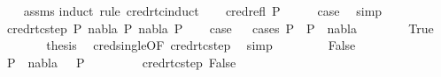 \begin{isabellebody}
%
\isadelimproof
\ \ %
\endisadelimproof
%
\isatagproof
{}\isamarkupfalse%
\ assms\isanewline
{}\isamarkupfalse%
{\isacharparenleft}{\kern0pt}induct\ rule{\isacharcolon}{\kern0pt}\ cred{\isacharunderscore}{\kern0pt}rtc{\isachardot}{\kern0pt}induct{\isacharparenright}{\kern0pt}\isanewline
\ \ \isamarkupfalse%
\ {\isacharparenleft}{\kern0pt}cred{\isacharunderscore}{\kern0pt}refl\ P{}{\isacharparenright}{\kern0pt}\isanewline
\ \ \isamarkupfalse%
\ \isamarkupfalse%
\ {\isacharquery}{\kern0pt}case\ \isamarkupfalse%
\ simp\isanewline
{}\isamarkupfalse%
\isanewline
\ \ \isamarkupfalse%
\ {\isacharparenleft}{\kern0pt}cred{\isacharunderscore}{\kern0pt}rtc{\isacharunderscore}{\kern0pt}step\ P{}\ nabla{}\ P{}\ nabla{}\ P{}{\isacharparenright}{\kern0pt}\isanewline
\ \ \isamarkupfalse%
\ {\isacharquery}{\kern0pt}case\isanewline
\ \ \isamarkupfalse%
{\isacharparenleft}{\kern0pt}cases\ {\isachardoublequoteopen}P{}\ {\isacharequal}{\kern0pt}\ P{}\ {\isasymand}\ nabla{}\ {\isacharequal}{\kern0pt}\ {\isacharbraceleft}{\kern0pt}{\isacharbraceright}{\kern0pt}{\isachardoublequoteclose}{\isacharparenright}{\kern0pt}\isanewline
\ \ \ \ \isamarkupfalse%
\ True\isanewline
\ \ \ \ \isamarkupfalse%
\ \isamarkupfalse%
\ {\isacharquery}{\kern0pt}thesis\ \isamarkupfalse%
\ cred{\isacharunderscore}{\kern0pt}single{\isacharbrackleft}{\kern0pt}OF\ cred{\isacharunderscore}{\kern0pt}rtc{\isacharunderscore}{\kern0pt}step{\isacharparenleft}{\kern0pt}{}{\isacharparenright}{\kern0pt}{\isacharbrackright}{\kern0pt}\ \isamarkupfalse%
\ simp\isanewline
\ \ \isamarkupfalse%
\isanewline
\ \ \ \ \isamarkupfalse%
\ False\isanewline
\ \ \ \ \isamarkupfalse%
\ {\isachardoublequoteopen}P{}\ {\isasymTurnstile}\ {\isacharparenleft}{\kern0pt}nabla{}{\isacharcomma}{\kern0pt}\ {\isacharbrackleft}{\kern0pt}{\isacharbrackright}{\kern0pt}{\isacharparenright}{\kern0pt}\ {\isasymRightarrow}\ P{}{\isachardoublequoteclose}\ \isanewline
\ \ \ \ \ \ \isamarkupfalse%
\ cred{\isacharunderscore}{\kern0pt}rtc{\isacharunderscore}{\kern0pt}step{\isacharparenleft}{\kern0pt}{}{\isacharparenright}{\kern0pt}\ False\ \isamarkupfalse%

\end{isabellebody}
